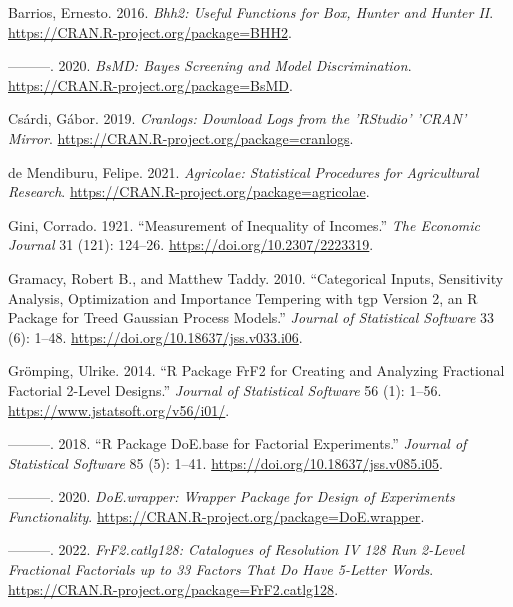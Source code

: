 \documentclass{article}
\newlength{\cslhangindent}
\newlength{\cslentryspacingunit} %
\newenvironment{CSLReferences}[2] %
 {%
  \setlength{\parindent}{0pt}
  \ifodd #1
  \let\oldpar\par
  \def\par{\hangindent=\cslhangindent\oldpar}
  \fi
  \setlength{\parskip}{#2\cslentryspacingunit}
 }%
 {}
\begin{document}
\hypertarget{refs}{}
\begin{CSLReferences}{1}{0}
\leavevmode{}%
Barrios, Ernesto. 2016. \emph{Bhh2: Useful Functions for Box, Hunter and
Hunter II}. \url{https://CRAN.R-project.org/package=BHH2}.

\leavevmode{}%
---------. 2020. \emph{BsMD: Bayes Screening and Model Discrimination}.
\url{https://CRAN.R-project.org/package=BsMD}.

\leavevmode{}%
Csárdi, Gábor. 2019. \emph{Cranlogs: Download Logs from the 'RStudio'
'CRAN' Mirror}. \url{https://CRAN.R-project.org/package=cranlogs}.

\leavevmode{}%
de Mendiburu, Felipe. 2021. \emph{Agricolae: Statistical Procedures for
Agricultural Research}.
\url{https://CRAN.R-project.org/package=agricolae}.

\leavevmode{}%
Gini, Corrado. 1921. {``Measurement of Inequality of Incomes.''}
\emph{The Economic Journal} 31 (121): 124--26.
\url{https://doi.org/10.2307/2223319}.

\leavevmode{}%
Gramacy, Robert B., and Matthew Taddy. 2010. {``Categorical Inputs,
Sensitivity Analysis, Optimization and Importance Tempering with {tgp}
Version 2, an {R} Package for Treed Gaussian Process Models.''}
\emph{Journal of Statistical Software} 33 (6): 1--48.
\url{https://doi.org/10.18637/jss.v033.i06}.

\leavevmode{}%
Grömping, Ulrike. 2014. {``{R} Package {FrF2} for Creating and Analyzing
Fractional Factorial 2-Level Designs.''} \emph{Journal of Statistical
Software} 56 (1): 1--56. \url{https://www.jstatsoft.org/v56/i01/}.

\leavevmode{}%
---------. 2018. {``{R} Package {DoE.base} for Factorial Experiments.''}
\emph{Journal of Statistical Software} 85 (5): 1--41.
\url{https://doi.org/10.18637/jss.v085.i05}.

\leavevmode{}%
---------. 2020. \emph{DoE.wrapper: Wrapper Package for Design of
Experiments Functionality}.
\url{https://CRAN.R-project.org/package=DoE.wrapper}.

\leavevmode{}%
---------. 2022. \emph{FrF2.catlg128: Catalogues of Resolution IV 128
Run 2-Level Fractional Factorials up to 33 Factors That Do Have 5-Letter
Words}. \url{https://CRAN.R-project.org/package=FrF2.catlg128}.


\end{CSLReferences}
\end{document}
